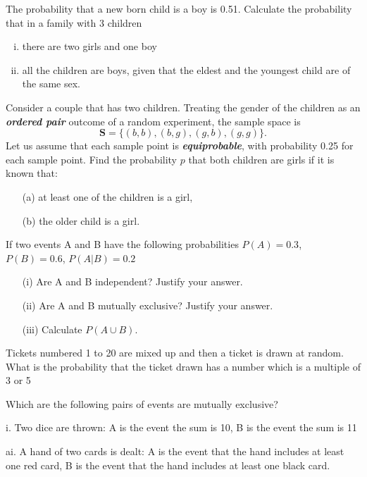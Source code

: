 \item The probability that a new born child is a boy is 0.51. Calculate the probability that in a family with 3 children
\begin{enumerate}[(i)]
\item there are two girls and one boy
\item all the children are boys, given that the eldest and the youngest child are of the same sex.
\end{enumerate}

\item 
Consider a couple that has two children. Treating the gender of the children as an \textit{\textbf{ordered pair}} outcome of a random experiment, the sample space is 
\[\boldsymbol{S} = \{ (b,b), (b,g), (g,b), (g,g)\}.\]
Let us assume that each sample point is \textit{\textbf{equiprobable}}, with probability 0.25 for each sample point.
Find the probability $p$ that both children are girls if it is known that: 

\begin{itemize}
\item[(a)] at least one of the children is a girl,
\item[(b)] the older child is a girl. 
\end{itemize}

\item 
If two events A and B have the following probabilities $P(A) = 0.3$, $P(B) = 0.6$, $P(A|B) = 0.2$

\begin{itemize}
\item[(i)] Are A and B independent? Justify your answer.
\item[(ii)] Are A and B mutually exclusive? Justify your answer.
\item[(iii)] Calculate $P(A \cup B)$.
\end{itemize}





\item Tickets numbered 1 to 20 are mixed up and then a ticket is drawn at random. What is the probability that the ticket drawn has a number which is a multiple of 3 or 5

\item 
Which are the following pairs of events are mutually exclusive?

i.
Two dice are thrown: A is the event the sum is 10, B is the event the sum is 11


ai.
A hand of two cards is dealt: A is the event that the hand includes at least one red card, B is the event that the hand includes at least one black card.


